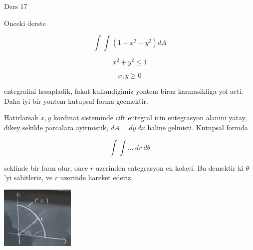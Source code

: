 \documentclass[12pt,fleqn]{article}
\begin{document}
Ders 17

Onceki derste 

\[ \int \int (1-x^2-y^2) dA \]

\[ x^2+y^2 \le 1 \]

\[ x,y \ge 0 \]

entegralini hesapladik, fakat kullandigimiz yontem biraz karmasikliga yol
acti. Daha iyi bir yontem kutupsal forma gecmektir. 

Hatirlarsak $x,y$ kordinat sisteminde cift entegral icin entegrasyon
alanini yatay, dikey sekilde parcalara ayirmistik, $dA = dy \ dx$ haline
gelmisti. Kutupsal formda 

\[ \int \int  ... \ dr \ d\theta\]

seklinde bir form olur, once $r$ uzerinden entegrasyon en kolayi. Bu
demektir ki $\theta$'yi sabitleriz, ve $r$ uzerinde hareket ederiz. 

\includegraphics[height=3cm]{17_1.png}
\end{document}
